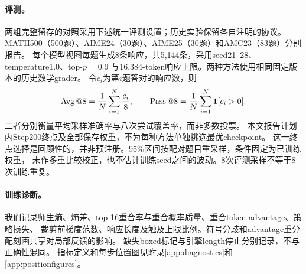 \paragraph{评测。}
两组完整留存的对照采用下述统一评测设置；历史实验保留各自注明的协议。
MATH500（500题）、AIME24（30题）、AIME25（30题）和AMC23（83题）分别报告。
每个模型视图每题生成8条响应，共5,144条，采用seed21--28、temperature1.0、top-$p=0.9$
与16,384-token响应上限。两种方法使用相同固定版本的历史数学grader。
令$c_i$为第$i$题答对的响应数，则
\begin{equation}
 \operatorname{Avg}@8=\frac{1}{N}\sum_{i=1}^N\frac{c_i}{8},\qquad
 \operatorname{Pass}@8=\frac{1}{N}\sum_{i=1}^N\mathbf{1}[c_i>0].
 \label{eq:metrics}
\end{equation}
二者分别衡量平均采样准确率与八次尝试覆盖率，而非多数投票。
本文报告计划内Step200终点及全部保存权重，不为每种方法单独挑选最优checkpoint。
这一终点选择是回顾性的，并非预注册。95\%区间按配对题目重采样，条件固定为已训练权重，
未作多重比较校正，也不估计训练seed之间的波动。8次评测采样不等于8次训练重复。

\paragraph{训练诊断。}
我们记录师生熵、熵差、top-16重合率与重合概率质量、重合token advantage、策略损失、
裁剪前梯度范数、响应长度及触及上限比例。符号分歧和advantage重分配刻画共享对局部反馈的影响。
缺失boxed标记与引擎length停止分别记录，不与正确性混同。
指标定义和每步位置图见附录\ref{app:diagnostics}和\ref{app:positionfigures}。
